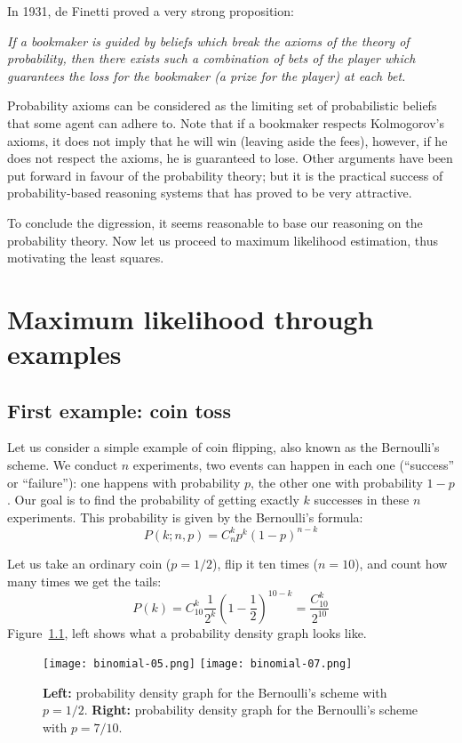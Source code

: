 \documentclass[notitlepage,oneside]{book}
\begin{document}
In 1931, de Finetti proved a very strong proposition:

\vspace{4mm}

\textit{If a bookmaker is guided by beliefs which break the axioms of the theory of probability,
then there exists such a combination of bets of the player which guarantees the loss for the bookmaker (a prize for the player) at each bet.
}

\vspace{4mm}

Probability axioms can be considered as the limiting set of probabilistic beliefs that some agent can adhere to.
Note that if a bookmaker respects Kolmogorov's axioms, it does not imply that he will win (leaving aside the fees),
however, if he does not respect the axioms, he is guaranteed to lose.
Other arguments have been put forward in favour of the probability theory;
but it is the practical success of probability-based reasoning systems that has proved to be very attractive.

To conclude the digression, it seems reasonable to base our reasoning on the probability theory.
Now let us proceed to maximum likelihood estimation, thus motivating the least squares.

\chapter{Maximum likelihood through examples}
\section{First example: coin toss}
\label{sec:cointoss}
Let us consider a simple example of coin flipping, also known as the Bernoulli's scheme. 
We conduct $n$ experiments, two events can happen in each one (``success'' or ``failure''): 
one happens with probability $p$, the other one with probability $1-p$. 
Our goal is to find the probability of getting exactly $k$ successes in these $n$ experiments. 
This probability is given by the Bernoulli's formula:
$$
P(k;n,p) = C_n^k p^k (1-p)^{n-k}
$$

Let us take an ordinary coin ($p=1/2$), flip it ten times ($n=10$), and count how many times we get the tails:
$$P(k) = C_{10}^k \frac{1}{2^k}\left(1-\frac{1}{2}\right)^{10-k} = \frac{C_{10}^k}{2^{10}}$$
Figure~\ref{fig:binomial}, left shows what a probability density graph looks like.

\begin{figure}[htb!]
\centering
\texttt{[image: binomial-05.png]}
\texttt{[image: binomial-07.png]}
\caption{\textbf{Left:} probability density graph for the Bernoulli's scheme with $p=1/2$. \textbf{Right:} probability density graph for the Bernoulli's scheme with $p=7/10$.}
\label{fig:binomial}
\end{figure}
\end{document}
